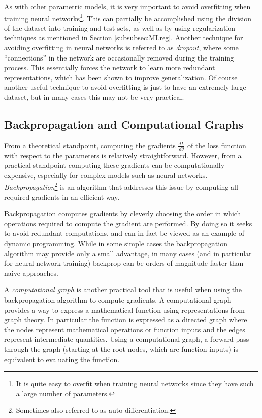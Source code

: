 As with other parametric models, it is very important to avoid overfitting when training neural networks\footnote{It is quite easy to overfit when training neural networks since they have such a large number of parameters.}. This can partially be accomplished using the division of the dataset into training and test sets, as well as by using regularization techniques as mentioned in Section \ref{subsubsec:MLreg}. Another technique for avoiding overfitting in neural networks is referred to as \textit{dropout}, where some ``connections'' in the network are occasionally removed during the training process. This essentially forces the network to learn more redundant representations, which has been shown to improve generalization. Of course another useful technique to avoid overfitting is just to have an extremely large dataset, but in many cases this may not be very practical.

\subsection{Backpropagation and Computational Graphs}
From a theoretical standpoint, computing the gradients $\frac{d L}{d \theta}$ of the loss function with respect to the parameters is relatively straightforward. However, from a practical standpoint computing these gradients can be computationally expensive, especially for complex models such as neural networks.
\textit{Backpropagation}\footnote{Sometimes also referred to as auto-differentiation.} is an algorithm that addresses this issue by computing all required gradients in an efficient way. 

Backpropagation computes gradients by cleverly choosing the order in which operations required to compute the gradient are performed. By doing so it seeks to avoid redundant computations, and can in fact be viewed as an example of dynamic programming. While in some simple cases the backpropagation algorithm may provide only a small advantage, in many cases (and in particular for neural network training) backprop can be orders of magnitude faster than naive approaches.

A \textit{computational graph} is another practical tool that is useful when using the backpropagation algorithm to compute gradients. A computational graph provides a way to express a mathematical function using representations from graph theory. In particular the function is expressed as a directed graph where the nodes represent mathematical operations or function inputs and the edges represent intermediate quantities. Using a computational graph, a forward pass through the graph (starting at the root nodes, which are function inputs) is equivalent to evaluating the function.

